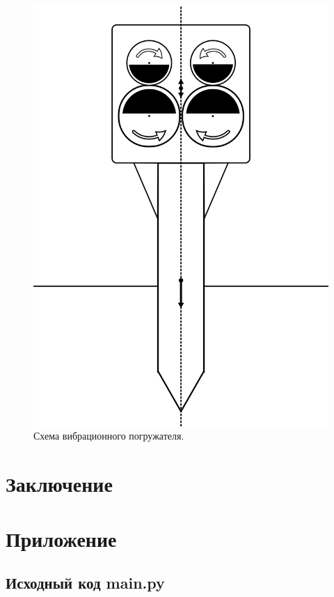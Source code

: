 \documentclass[14pt, a4paper]{extarticle}
\begin{document}
    \begin{figure}[h]
        \centering
        \includegraphics[width=0.5\linewidth]{img/scheme_porg.png}
        \caption{Схема вибрационного погружателя.}
        \label{fig:scheme_porg}
    \end{figure}

    

    \clearpage
    \section{Заключение}


    \clearpage
    \section{Приложение}
    \subsection{Исходный код main.py}


    \clearpage
    \begin{thebibliography}{}
        \bibitem{}
    \end{thebibliography}
\end{document}
